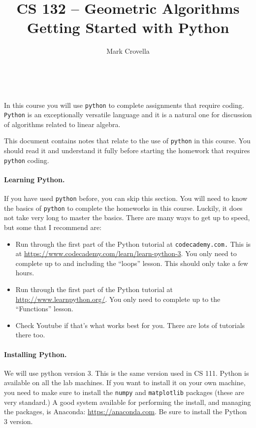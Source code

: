\documentclass{article}
\begin{document}
\title{CS 132 -- Geometric Algorithms\\[0.25\baselineskip]Getting
  Started with Python}
\author{Mark Crovella}
\date{~}
\maketitle
\thispagestyle{empty}

\vspace{-0.5in}

In this course you will use \texttt{python} to complete assignments that require coding.   \texttt{Python} is an exceptionally versatile language and it is a natural one for discussion of algorithms related to linear algebra.

This document contains notes that relate to the use of \texttt{python} in this course.   You should read it and understand it fully before starting the homework that requires \texttt{python} coding.

\paragraph{Learning Python.}   If you have used \texttt{python} before, you can skip this section.   You will need to know the basics of \texttt{python} to complete the homeworks in this course.   Luckily, it does not take very long to master the basics.   There are many ways to get up to speed, but some that I recommend are:
\begin{itemize}
\item Run through the first part of the Python tutorial at \texttt{codecademy.com.}   This is at \url{https://www.codecademy.com/learn/learn-python-3}.   You only need to complete up to and including the ``loops'' lesson.   This should only take a few hours.
\item Run through the first part of the Python tutorial at \url{http://www.learnpython.org/}.   You only need to complete up to the ``Functions'' lesson.
\item Check Youtube if that's what works best for you.  There are lots of tutorials there too.
\end{itemize}

\paragraph{Installing Python.}  We will use python version 3.  This is
the same version used in CS 111.  Python is available on all the lab
machines.  If you want to install it on your own machine, you need to
make sure to install the \texttt{numpy} and \texttt{matplotlib} packages
(these are very standard.)  A good system available for performing the
install, and managing the packages, is Anaconda:
\url{https://anaconda.com}.   Be sure to install
the Python 3 version. 
\end{document}
